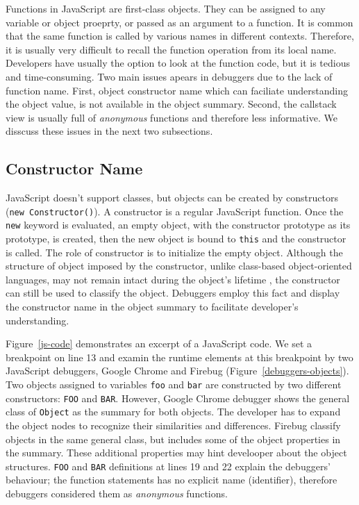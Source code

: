\documentclass{acm_proc_article-sp}
\begin{document}
Functions in JavaScript are first-class objects. They can be assigned to any variable or object proeprty, or passed as an argument to a function. It is common that the same function is called by various names in different contexts. Therefore, it is usually very difficult to recall the function operation from its local name. Developers have usually the option to look at the function code, but it is tedious and time-consuming. Two main issues apears in debuggers due to the lack of function name. First, object constructor name which can faciliate understanding the object value, is not available in the object summary. Second, the callstack view is usually full of \textit{anonymous} functions and therefore less informative. We disscuss these issues in the next two subsections.
 

\subsection{Constructor Name}
JavaScript doesn't support classes, but objects can be created by constructors ({\small\texttt{new Constructor()}}). A constructor is a regular JavaScript function. Once the {\small\texttt{new}} keyword is evaluated, an empty object, with the constructor prototype as its prototype, is created, then the new object is bound to {\small\texttt{this}} and the constructor is called. The role of constructor is to initialize the empty object. Although the structure of object imposed by the constructor, unlike class-based object-oriented languages, may not remain intact during the object's lifetime \cite{Richards}, the constructor can still be used to classify the object. 
Debuggers employ this fact and display the constructor name in the object summary to facilitate developer's understanding. 

Figure~\ref{js-code} demonstrates an excerpt of a JavaScript code. We set a breakpoint on line 13 and examin the runtime elements at this breakpoint by two JavaScript debuggers, Google Chrome and Firebug (Figure~\ref{debuggers-objects}). Two objects assigned to variables {\small\texttt{foo}} and {\small\texttt{bar}} are constructed by two different constructors: {\small\texttt{FOO}} and {\small\texttt{BAR}}. However, Google Chrome debugger shows the general class of {\small\texttt{Object}} as the summary for both objects. The developer has to expand the object nodes to recognize their similarities and differences. Firebug classify objects in the same general class, but includes some of the object properties in the summary. These additional properties may hint develooper about the object structures. {\small\texttt{FOO}} and {\small\texttt{BAR}} definitions at lines 19 and 22 explain the debuggers' behaviour; the function statements has no explicit name (identifier), therefore debuggers considered them as \textit{anonymous} functions.
\end{document}
